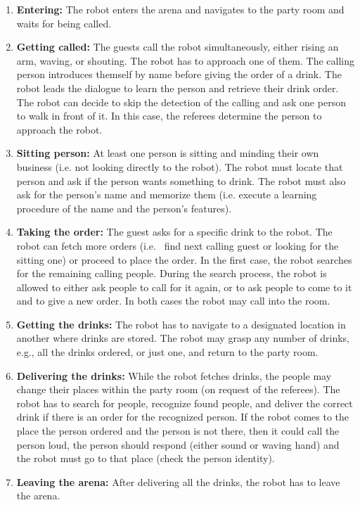 \begin{enumerate}

	\item \textbf{Entering:} The robot enters the arena and navigates to the party room and waits for being called.

	\item \textbf{Getting called:} The guests call the robot simultaneously, either rising an arm, waving, or shouting. The robot has to approach one of them.
	The calling person introduces themself by name before giving the order of a drink. The robot leads the dialogue to learn the person and retrieve their drink order. \\

	The robot can decide to skip the detection of the calling and ask one person to walk in front of it. In this case, the referees determine the person to approach the robot.

	\item \textbf{Sitting person:} At least one person is sitting and minding their own business (i.e. not looking directly to the robot). The robot must locate that person and ask if the person wants something to drink. The robot must also ask for the person's name and memorize them (i.e. execute a learning procedure of the name and the person's features).

	\item \textbf{Taking the order:} The guest asks for a specific drink to the robot. The robot can fetch more orders (i.e.~ find next calling guest or looking for the sitting one) or proceed to place the order. In the first case, the robot searches for the remaining calling people. During the search process, the robot is allowed to either ask people to call for it again, or to ask people to come to it and to give a new order. In both cases the robot may call into the room.

	\item \textbf{Getting the drinks:} The robot has to navigate to a designated location in another  where drinks are stored. The robot may grasp any number of drinks, e.g., all the drinks ordered, or just one, and return to the party room.

	\item \textbf{Delivering the drinks:} While the robot fetches drinks, the people may change their places within the party room (on request of the referees). The robot has to search for people, recognize found people, and deliver the correct drink if there is an order for the recognized person. If the robot comes to the place the person ordered and the person is not there, then it could call the person loud, the person should respond (either sound or waving hand) and the robot must go to that place (check the person identity).

	\item \textbf{Leaving the arena:} After delivering all the drinks, the robot has to leave the arena.
\end{enumerate}

